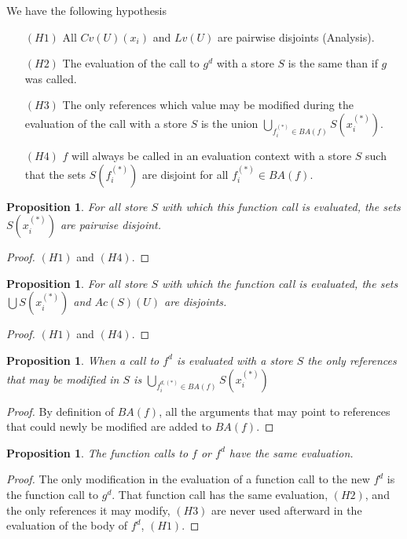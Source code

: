 \documentclass[12pt,a4paper]{article}
\newtheorem{proposition}[theorem]{Proposition}
\begin{document}
We have the following hypothesis
\begin{itemize}
\item[$(H1)$] All $Cv(U)(x_i)$ and $Lv(U)$ are pairwise disjoints (Analysis).
\item[$(H2)$] The evaluation of the call to $g^d$ with a store $S$ is the same than if $g$ was called.
\item[$(H3)$] The only references which value may be modified during the evaluation of the call with a store $S$ is the union $\bigcup_{f^{(*)}_i \in BA(f)} S\left(x^{(*)}_i\right)$.
\item[$(H4)$] $f$ will always be called in an evaluation context with a store $S$ such that the sets $S\left(f^{(*)}_i\right)$ are disjoint for all $f^{(*)}_i \in BA(f)$.
\end{itemize}
\begin{proposition}
For all store $S$ with which this function call is evaluated, the sets $S\left(x^{(*)}_i\right)$ are pairwise disjoint.
\end{proposition}
\begin{proof}
$(H1)$ and $(H4)$.
\end{proof}

\begin{proposition}
For all store $S$ with which the function call is evaluated, the sets $\bigcup S\left(x^{(*)}_i\right)$ and $Ac(S)(U)$ are disjoints.
\end{proposition}
\begin{proof}
$(H1)$ and $(H4)$.
\end{proof}

\begin{proposition}
When a call to $f^d$ is evaluated with a store $S$ the only references that may be modified in $S$ is $\bigcup_{f^{d,(*)}_i \in BA(f)} S\left(x^{(*)}_i\right)$
\end{proposition}
\begin{proof}
By definition of $BA(f)$, all the arguments that may point to references that could newly be modified are added to $BA(f)$.
\end{proof}

\begin{proposition}
The function calls to $f$ or $f^d$ have the same evaluation.
\end{proposition}
\begin{proof}
The only modification in the evaluation of a function call to the new $f^d$ is the function call to $g^d$. That function call has the same evaluation, $(H2)$, and the only references it may modify, $(H3)$ are never used afterward in the evaluation of the body of $f^d$, $(H1)$.
\end{proof}
\end{document}
